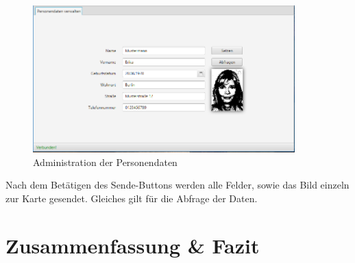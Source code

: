 \documentclass[	a4paper,
			11pt,
			oneside,
			parskip]{scrartcl}
\begin{document}
\begin{figure}[H]
	\centering
  	\includegraphics[width=0.9\textwidth]{img/pers}
	\caption{Administration der Personendaten}
	\label{pers}
\end{figure}

Nach dem Betätigen des Sende-Buttons werden alle Felder, sowie das Bild einzeln zur Karte gesendet. Gleiches gilt für die Abfrage der Daten.	
	

\section{Zusammenfassung \& Fazit}
\end{document}
